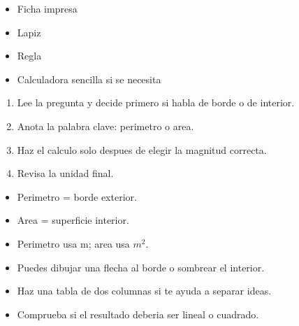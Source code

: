 \documentclass[12pt,a4paper]{article}
\begin{document}
        \FichaCabecera

        \begin{materialesbox}
        \begin{itemize}
    \item Ficha impresa
    \item Lapiz
    \item Regla
    \item Calculadora sencilla si se necesita
\end{itemize}
        \end{materialesbox}

        \begin{pasosbox}
        \begin{enumerate}
    \item Lee la pregunta y decide primero si habla de borde o de interior.
    \item Anota la palabra clave: perimetro o area.
    \item Haz el calculo solo despues de elegir la magnitud correcta.
    \item Revisa la unidad final.
\end{enumerate}
        \end{pasosbox}

        \begin{recordatoriobox}
        \begin{itemize}
    \item Perimetro = borde exterior.
    \item Area = superficie interior.
    \item Perimetro usa m; area usa $m^2$.
\end{itemize}
        \end{recordatoriobox}

        \begin{apoyobox}
        \begin{itemize}
    \item Puedes dibujar una flecha al borde o sombrear el interior.
    \item Haz una tabla de dos columnas si te ayuda a separar ideas.
    \item Comprueba si el resultado deberia ser lineal o cuadrado.
\end{itemize}
        \end{apoyobox}


\end{document}
